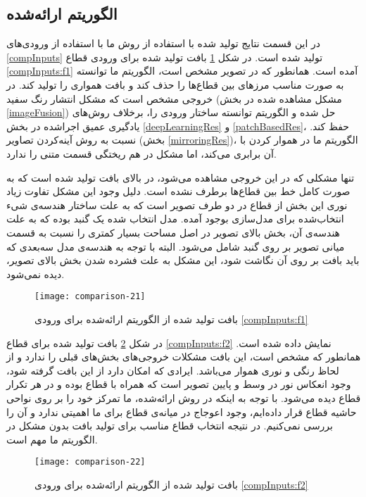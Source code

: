 \subsection{الگوریتم ارائه‌شده} \label{ourAlgCompRes}
در این قسمت نتایج تولید شده با استفاده از روش ما با استفاده از ورودی‌های \ref{compInputs} تولید شده است. در شکل \ref{compOurs1} بافت تولید شده برای ورودی قطاع \ref{compInputs:f1} آمده است. همانطور که در تصویر مشخص است، الگوریتم ما توانسته به صورت مناسب مرز‌های بین قطاع‌ها را حذف کند و بافت همواری را تولید کند. در خروجی مشخص است که مشکل انتشار رنگ سفید (مشکل مشاهده شده در بخش \ref{imageFusion}) حل شده و الگوریتم توانسته ساختار ورودی را، برخلاف روش‌های یادگیری عمیق اجرا‌شده در بخش \ref{deepLearningRes} و \ref{patchBasedRes}، حفظ کند. نسبت به روش آینه‌کردن تصاویر (بخش \ref{mirroringRes})، الگوریتم ما در هموار کردن با آن برابری می‌کند، اما مشکل در هم ریختگی قسمت متنی را ندارد.

 تنها مشکلی که در این خروجی مشاهده می‌شود، در بالای بافت تولید شده است که به صورت کامل خط بین قطاع‌ها برطرف نشده است. دلیل وجود این مشکل تفاوت زیاد نوری این بخش از قطاع در دو طرف تصویر است که به علت ساختار هندسه‌ی شیء انتخاب‌شده برای مدل‌سازی بوجود آمده. مدل انتخاب شده یک گنبد بوده که به علت هندسه‌ی آن، بخش بالای تصویر در اصل مساحت بسیار کمتری را نسبت به قسمت میانی تصویر بر روی گنبد شامل می‌شود. البته با توجه به هندسه‌ی مدل سه‌بعدی که باید بافت بر روی آن نگاشت شود، این مشکل به علت فشرده شدن بخش بالای تصویر، دیده نمی‌شود.
\begin{figure}[h!]
	\centering
	\texttt{[image: comparison-21]}
	\caption{بافت تولید شده از الگوریتم ارائه‌شده برای ورودی \ref{compInputs:f1}}
	\label{compOurs1}
\end{figure}

در شکل \ref{compOurs2} بافت تولید شده برای قطاع \ref{compInputs:f2} نمایش داده شده است. همانطور که مشخص است، این بافت مشکلات خروجی‌های بخش‌های قبلی را ندارد و از لحاظ رنگی و نوری هموار می‌باشد. ایرادی که امکان دارد از این بافت گرفته شود، وجود انعکاس نور در وسط و پایین تصویر است که  همراه با قطاع بوده و در هر تکرار قطاع دیده می‌شود. با توجه به اینکه در روش ارائه‌شده، ما تمرکز خود را بر روی نواحی حاشیه قطاع قرار داده‌ایم، وجود اعوجاج در میانه‌ی قطاع برای ما اهمیتی ندارد و آن را بررسی نمی‌کنیم. در نتیجه انتخاب قطاع مناسب برای تولید بافت بدون مشکل در الگوریتم ما مهم است.
\begin{figure}[h!]
	\centering
	\texttt{[image: comparison-22]}
	\caption{بافت تولید شده از الگوریتم ارائه‌شده برای ورودی \ref{compInputs:f2}}
	\label{compOurs2}
\end{figure}


